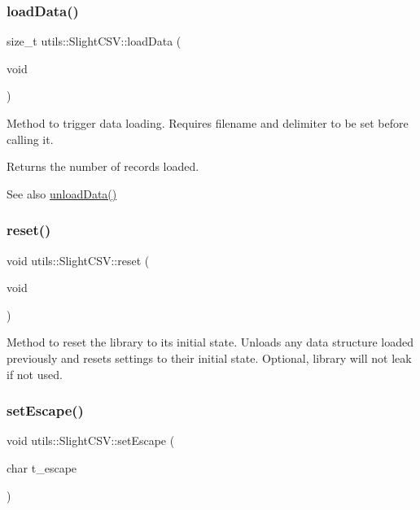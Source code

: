 \subsubsection{\texorpdfstring{load\+Data()}{loadData()}}
{\footnotesize\ttfamily size\+\_\+t utils\+::\+Slight\+C\+S\+V\+::load\+Data (\begin{DoxyParamCaption}\item[{void}]{ }\end{DoxyParamCaption})}

Method to trigger data loading. Requires filename and delimiter to be set before calling it. \begin{DoxyReturn}{Returns}
the number of records loaded. 
\end{DoxyReturn}
\begin{DoxySeeAlso}{See also}
\hyperlink{classutils_1_1SlightCSV_aaa9c8042d6231660cb08ada7c1a8dccb}{unload\+Data()} 
\end{DoxySeeAlso}
\mbox{\label{classutils_1_1SlightCSV_abc28f1e33cc67dd5d4380254070ecf97}} 
\subsubsection{\texorpdfstring{reset()}{reset()}}
{\footnotesize\ttfamily void utils\+::\+Slight\+C\+S\+V\+::reset (\begin{DoxyParamCaption}\item[{void}]{ }\end{DoxyParamCaption})}

Method to reset the library to its initial state. Unloads any data structure loaded previously and resets settings to their initial state. Optional, library will not leak if not used. \mbox{\label{classutils_1_1SlightCSV_a6673b7489c55fe9613f0ebd5dce19da4}} 
\subsubsection{\texorpdfstring{set\+Escape()}{setEscape()}}
{\footnotesize\ttfamily void utils\+::\+Slight\+C\+S\+V\+::set\+Escape (\begin{DoxyParamCaption}\item[{char}]{t\+\_\+escape }\end{DoxyParamCaption})}

